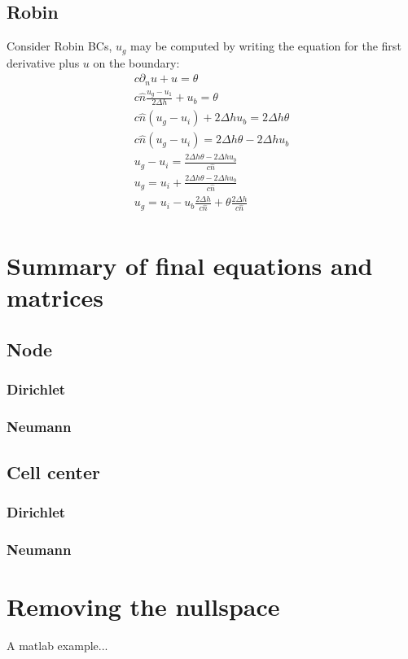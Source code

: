 \documentclass[landscape]{article}
\newcommand{\PD}{\partial}
\begin{document}
\subsection{Robin}
Consider Robin BCs, $u_g$ may be computed by writing the equation for the first derivative plus $u$ on the boundary:
\begin{equation}\begin{aligned}
  c \PD_n u + u = \theta \\
  c \hat{n} \frac{u_g - u_1}{2 \Delta h} + u_b = \theta \\
  c \hat{n} (u_g - u_i) + 2 \Delta h u_b = 2 \Delta h \theta \\
  c \hat{n} (u_g - u_i) = 2 \Delta h \theta - 2 \Delta h u_b \\
  u_g - u_i = \frac{2 \Delta h \theta - 2 \Delta h u_b}{c \hat{n}} \\
  u_g = u_i + \frac{2 \Delta h \theta - 2 \Delta h u_b}{c \hat{n}} \\
  u_g = u_i - u_b \frac{2 \Delta h}{c \hat{n}} + \theta \frac{2 \Delta h}{c \hat{n}}\\
\end{aligned}\end{equation}

\newpage

\section{Summary of final equations and matrices}
\subsection{Node}
\subsubsection{Dirichlet}
\subsubsection{Neumann}
\subsection{Cell center}
\subsubsection{Dirichlet}
\subsubsection{Neumann}

\newpage
\section{Removing the nullspace}
A matlab example...
\end{document}
